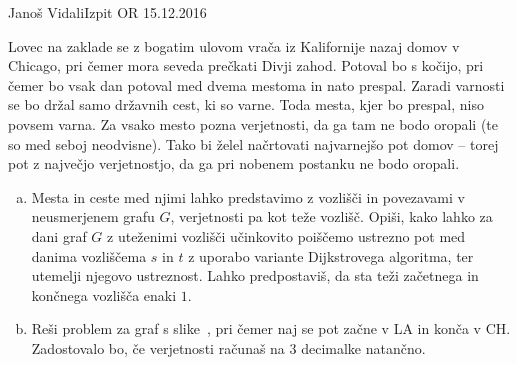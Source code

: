 \begin{naloga}{Janoš Vidali}{Izpit OR 15.12.2016}
\begin{vprasanje}
Lovec na zaklade se z bogatim ulovom
vrača iz Kalifornije nazaj domov v Chicago,
pri čemer mora seveda prečkati Divji zahod.
Potoval bo s kočijo,
pri čemer bo vsak dan potoval med dvema mestoma in nato prespal.
Zaradi varnosti se bo držal samo državnih cest, ki so varne.
Toda mesta, kjer bo prespal, niso povsem varna.
Za vsako mesto pozna verjetnosti,
da ga tam ne bodo oropali (te so med seboj neodvisne).
Tako bi želel načrtovati najvarnejšo pot domov
-- torej pot z največjo verjetnostjo,
da ga pri nobenem postanku ne bodo oropali.

\begin{enumerate}[(a)]
\item Mesta in ceste med njimi lahko predstavimo z vozlišči in povezavami
v ne\-usme\-rje\-nem grafu $G$, verjetnosti pa kot teže vozlišč.
Opiši, kako lahko za dani graf $G$ z uteženimi vozlišči
učinkovito poiščemo ustrezno pot med danima vozliščema $s$ in $t$
z uporabo variante Dijkstrovega algoritma,
ter utemelji njegovo ustreznost.
Lahko predpostaviš, da sta teži začetnega in končnega vozlišča enaki $1$.

\item Reši problem za graf s slike~\fig,
pri čemer naj se pot začne v LA in konča v CH.
Zadostovalo bo, če verjetnosti računaš na $3$ decimalke natančno.
\end{enumerate}

\begin{slika}
\pgfslika
{}
\end{slika}
\end{vprasanje}


\end{naloga}
